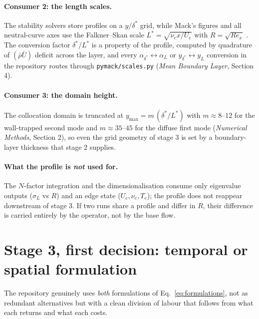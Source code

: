 \documentclass[11pt]{article}
\begin{document}
\paragraph{Consumer 2: the length scales.} The stability solvers store profiles on a
$y/\delta^*$ grid, while Mack's figures and all neutral-curve axes use the Falkner--Skan scale
$L^*=\sqrt{\nu_ex/U_e}$ with $R=\sqrt{Re_x}$ \cite{mack1984}. The conversion factor
$\delta^*/L^*$ is a property of the profile, computed by quadrature of $(\bar\rho\bar U)$ deficit
across the layer, and every $\alpha_{\delta^*}\!\leftrightarrow\!\alpha_L$ or
$y_{\delta^*}\!\leftrightarrow\!y_L$ conversion in the repository routes through
\texttt{pymack/scales.py} (\emph{Mean Boundary Layer}, Section 4).

\paragraph{Consumer 3: the domain height.} The collocation domain is truncated at
$y_{\max}=m\,(\delta^*/L^*)$ with $m\approx8$--$12$ for the wall-trapped second mode and
$m\approx35$--$45$ for the diffuse first mode (\emph{Numerical Methods}, Section 2), so even the
grid geometry of stage 3 is set by a boundary-layer thickness that stage 2 supplies.

\paragraph{What the profile is \emph{not} used for.} The $N$-factor integration and the
dimensionalisation consume only eigenvalue outputs ($\sigma_L$ vs $R$) and an edge state
($U_e,\nu_e,T_e$); the profile does not reappear downstream of stage 3. If two runs share a
profile and differ in $R$, their difference is carried entirely by the operator, not by the base
flow.

\section{Stage 3, first decision: temporal or spatial formulation}\label{sec:formulations}
The repository genuinely uses \emph{both} formulations of Eq.~\eqref{eq:formulations}, not as
redundant alternatives but with a clean division of labour that follows from what each returns
and what each costs.
\end{document}

